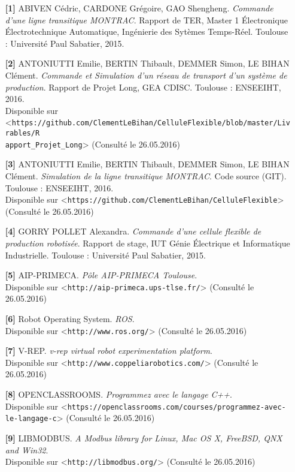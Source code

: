 \documentclass[a4paper,french, titlepage]{book}
\begin{document}
\begin{itemize}
\item[ \textbf{[1]}] ABIVEN Cédric, CARDONE Grégoire, GAO Shengheng. \textit{Commande d'une ligne transitique MONTRAC}. Rapport de TER, Master 1 Électronique Électrotechnique Automatique, Ingénierie des Sytèmes Temps-Réel. Toulouse : Université Paul Sabatier, 2015.
\item[ ]
\item[ \textbf{[2]} ] ANTONIUTTI Emilie, BERTIN Thibault, DEMMER Simon, LE BIHAN Clément. \textit{Commande et Simulation d'un réseau de transport d'un système de production}. Rapport de Projet Long, GEA CDISC. Toulouse : ENSEEIHT, 2016.\\
Disponible sur <\verb!https://github.com/ClementLeBihan/CelluleFlexible/blob/master/Livrables/R!\\
\verb!apport_Projet_Long!> (Consulté le 26.05.2016)
\item[ ]
\item[ \textbf{[3]} ] ANTONIUTTI Emilie, BERTIN Thibault, DEMMER Simon, LE BIHAN Clément. \textit{Simulation de la ligne transitique MONTRAC}. Code source (GIT). Toulouse : ENSEEIHT, 2016.\\
Disponible sur <\verb!https://github.com/ClementLeBihan/CelluleFlexible!> (Consulté le 26.05.2016)
\item[ ]
\item[ \textbf{[4]} ] GORRY POLLET Alexandra. \textit{Commande d’une cellule flexible de production robotisée}. Rapport de stage, IUT Génie Électrique et Informatique Industrielle. Toulouse : Université Paul Sabatier, 2015.
\item[ ]
\item[ \textbf{[5]} ] AIP-PRIMECA. \textit{Pôle AIP-PRIMECA Toulouse}.\\
Disponible sur <\verb!http://aip-primeca.ups-tlse.fr/!> (Consulté le 26.05.2016)
\item[ ]
\item[ \textbf{[6]} ] Robot Operating System. \textit{ROS}.\\
Disponible sur <\verb!http://www.ros.org/!> (Consulté le 26.05.2016)
\item[ ]
\item[ \textbf{[7]} ] V-REP. \textit{v-rep virtual robot experimentation platform}.\\
Disponible sur <\verb!http://www.coppeliarobotics.com/!> (Consulté le 26.05.2016)
\item[ ]
\item[ \textbf{[8]} ] OPENCLASSROOMS. \textit{Programmez avec le langage C++}.\\
Disponible sur <\verb!https://openclassrooms.com/courses/programmez-avec-le-langage-c!> (Consulté le 26.05.2016)
\item[ ]
\item[ \textbf{[9]} ] LIBMODBUS. \textit{A Modbus library for Linux, Mac OS X, FreeBSD, QNX and Win32}.\\
Disponible sur <\verb!http://libmodbus.org/!> (Consulté le 26.05.2016)
\item[ ]
\end{itemize}
\end{document}
